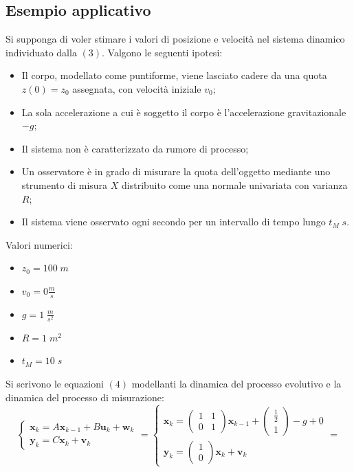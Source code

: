 \subsection{Esempio applicativo}
Si supponga di voler stimare i valori di posizione e velocit\`a nel sistema dinamico individuato dalla $(3)$. Valgono le seguenti ipotesi:
\begin{itemize}
	\item Il corpo, modellato come puntiforme, viene lasciato cadere da una quota $z(0) = z_0$ assegnata, con velocit\`a iniziale $v_0$;
	\item La sola accelerazione a cui \`e soggetto il corpo \`e l'accelerazione gravitazionale $-g$;
	\item Il sistema non \`e caratterizzato da rumore di processo;
	\item Un osservatore \`e in grado di misurare la quota dell'oggetto mediante uno strumento di misura $X$ 
	distribuito come una normale univariata con varianza $R$;
	\item Il sistema viene osservato ogni secondo per un intervallo di tempo lungo $t_{M}\;s$.
\end{itemize}
Valori numerici:
\begin{itemize}
	\item $z_0 = 100\;m$
	\item $v_0 = 0 \frac{m}{s}$
	\item $g = 1\;\frac{m}{s^2}$
	\item $R = 1\;m^2$
	\item $t_M = 10\;s$
\end{itemize}
Si scrivono le equazioni $(4)$ modellanti la dinamica del processo evolutivo e la dinamica del processo di misurazione:
$$
\begin{cases}
\mathbf x_k = A \mathbf x_{k-1} + B \mathbf u_k + \mathbf w_k \\
\mathbf y_k = C \mathbf x_k + \mathbf v_k
\end{cases} = 
\begin{cases}
\mathbf x_k = \left(\begin{matrix}
1 & 1 \\
0 & 1 
\end{matrix}\right) \mathbf x_{k-1} + \left(\begin{matrix}
\frac{1}{2} \\
1
\end{matrix}\right) -g + \underline 0 \\
\mathbf y_k = \left(\begin{matrix}
1\\
0
\end{matrix}\right) \mathbf x_k + \mathbf v_k
\end{cases} = 
$$
